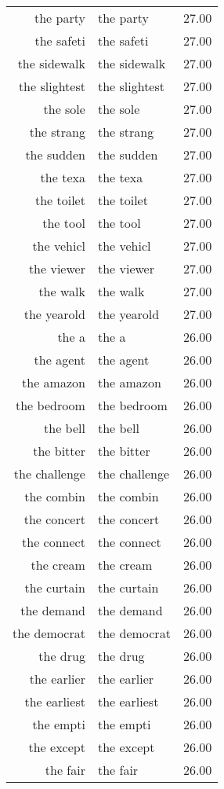 \begin{table}[ht]
\begin{tabular}{rlr}
  the party & the party & 27.00 \\ 
  the safeti & the safeti & 27.00 \\ 
  the sidewalk & the sidewalk & 27.00 \\ 
  the slightest & the slightest & 27.00 \\ 
  the sole & the sole & 27.00 \\ 
  the strang & the strang & 27.00 \\ 
  the sudden & the sudden & 27.00 \\ 
  the texa & the texa & 27.00 \\ 
  the toilet & the toilet & 27.00 \\ 
  the tool & the tool & 27.00 \\ 
  the vehicl & the vehicl & 27.00 \\ 
  the viewer & the viewer & 27.00 \\ 
  the walk & the walk & 27.00 \\ 
  the yearold & the yearold & 27.00 \\ 
  the a & the a & 26.00 \\ 
  the agent & the agent & 26.00 \\ 
  the amazon & the amazon & 26.00 \\ 
  the bedroom & the bedroom & 26.00 \\ 
  the bell & the bell & 26.00 \\ 
  the bitter & the bitter & 26.00 \\ 
  the challenge & the challenge & 26.00 \\ 
  the combin & the combin & 26.00 \\ 
  the concert & the concert & 26.00 \\ 
  the connect & the connect & 26.00 \\ 
  the cream & the cream & 26.00 \\ 
  the curtain & the curtain & 26.00 \\ 
  the demand & the demand & 26.00 \\ 
  the democrat & the democrat & 26.00 \\ 
  the drug & the drug & 26.00 \\ 
  the earlier & the earlier & 26.00 \\ 
  the earliest & the earliest & 26.00 \\ 
  the empti & the empti & 26.00 \\ 
  the except & the except & 26.00 \\ 
  the fair & the fair & 26.00 \\ 

\end{tabular}
\end{table}
